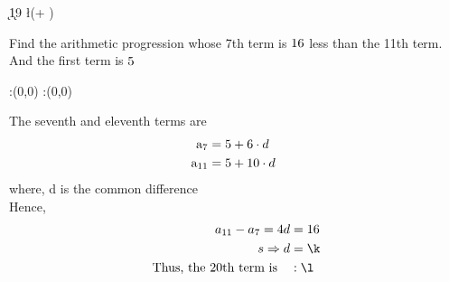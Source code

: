 


\DIVIDE{}\k
\MULTIPLY\k{19}\m
\gcalcexpr[0] \l {(\vbtwo + \m)} 

\question[4] Find the arithmetic progression whose 7th term is $16$ less than the 11th term. And the first term is $5$


\watchout

\ifprintanswers
  \begin{marginfigure}
      :(0,0)
      :(0,0)
    \figdrawbegin{}
      \figdrawline [100,101]
    \figdrawend
    \figvisu{\figBoxA}{}{%
    }
    \centerline{\box\figBoxA}
  \end{marginfigure}
\fi 

\begin{solution}[\halfpage]
The seventh and eleventh terms are \\
\begin{align}
\text{a}_{7} &= 5 + 6\cdot d \text\quad \\
\text{a}_{11} &= 5 + 10\cdot d
\end{align}
where, d is the common difference \\
Hence,    \\  
\begin{align}
\quad a_{11} - a_{7} = 4d &= \vbone\\s
\Rightarrow d &= \k  \\
\text{Thus, the 20th term is}\quad & : \l  %
\end{align}

\end{solution}


